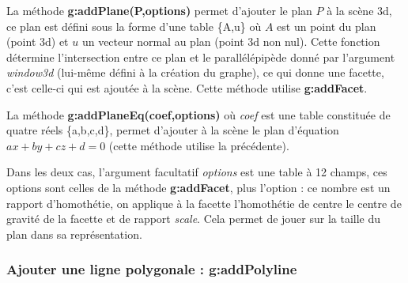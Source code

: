 \documentclass[%
10pt,%
a4paper,%
french,%
]%
{article}%
\begin{document}
La méthode \textbf{g:addPlane(P,options)} permet d'ajouter le plan $P$ à la scène 3d, ce plan est défini sous la forme d'une table \{A,u\} où $A$ est un point du plan (point 3d) et $u$ un vecteur normal au plan (point 3d non nul). Cette fonction détermine l'intersection entre ce plan et le parallélépipède donné par l'argument \emph{window3d} (lui-même défini à la création du graphe), ce qui donne une facette, c'est celle-ci qui est ajoutée à la scène. Cette méthode utilise \textbf{g:addFacet}.

La méthode \textbf{g:addPlaneEq(coef,options)} où \emph{coef} est une table constituée de quatre réels \{a,b,c,d\}, permet d'ajouter à la scène le plan d'équation $ax+by+cz+d=0$ (cette méthode utilise la précédente).

Dans les deux cas, l'argument facultatif \emph{options} est une table à 12 champs, ces options sont celles de la méthode \textbf{g:addFacet}, plus l'option  : ce nombre est un rapport d'homothétie, on applique à la facette l'homothétie de centre le centre de gravité de la facette et de rapport \emph{scale}. Cela permet de jouer sur la taille du plan dans sa représentation.
        

\subsubsection{Ajouter une ligne polygonale : g:addPolyline}
\end{document}
